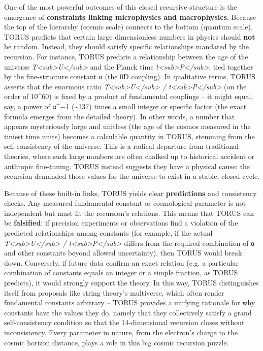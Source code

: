 \documentclass[
]{article}
\begin{document}
One of the most powerful outcomes of this closed recursive structure is
the emergence of \textbf{constraints linking microphysics and
macrophysics}. Because the top of the hierarchy (cosmic scale) connects
to the bottom (quantum scale), TORUS predicts that certain large
dimensionless numbers in physics should \textbf{not} be random. Instead,
they should satisfy specific relationships mandated by the recursion.
For instance, TORUS predicts a relationship between the age of the
universe \emph{T\textless sub\textgreater U\textless/sub\textgreater{}}
and the Planck time
\emph{t\textless sub\textgreater P\textless/sub\textgreater{}}, tied
together by the fine-structure constant α (the 0D coupling). In
qualitative terms, TORUS asserts that the enormous ratio
\emph{T\textless sub\textgreater U\textless/sub\textgreater{} /
t\textless sub\textgreater P\textless/sub\textgreater{}} (on the order
of 10\^{}60) is fixed by a product of fundamental couplings -- it might
equal, say, a power of α\^{}−1 (\textasciitilde137) times a small
integer or specific factor (the exact formula emerges from the detailed
theory). In other words, a number that appears mysteriously large and
unitless (the age of the cosmos measured in the tiniest time units)
becomes a calculable quantity in TORUS, stemming from the
self-consistency of the universe. This is a radical departure from
traditional theories, where such large numbers are often chalked up to
historical accident or anthropic fine-tuning. TORUS instead suggests
they have a physical cause: the recursion demanded those values for the
universe to exist in a stable, closed cycle.

Because of these built-in links, TORUS yields clear \textbf{predictions}
and consistency checks. Any measured fundamental constant or
cosmological parameter is not independent but must fit the recursion's
relations. This means that TORUS can be \textbf{falsified}: if precision
experiments or observations find a violation of the predicted
relationships among constants (for example, if the actual
\emph{T\textless sub\textgreater U\textless/sub\textgreater{} /
t\textless sub\textgreater P\textless/sub\textgreater{}} differs from
the required combination of α and other constants beyond allowed
uncertainty), then TORUS would break down. Conversely, if future data
confirm an exact relation (e.g. a particular combination of constants
equals an integer or a simple fraction, as TORUS predicts), it would
strongly support the theory. In this way, TORUS distinguishes itself
from proposals like string theory's multiverse, which often render
fundamental constants arbitrary -- TORUS provides a unifying rationale
for why constants have the values they do, namely that they collectively
satisfy a grand self-consistency condition so that the 14-dimensional
recursion closes without inconsistency. Every parameter in nature, from
the electron's charge to the cosmic horizon distance, plays a role in
this big cosmic recursion puzzle.
\end{document}

